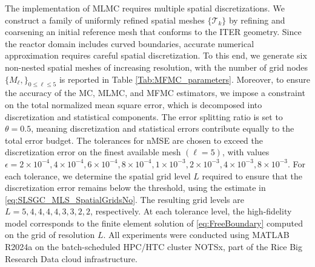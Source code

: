 The implementation of MLMC requires multiple spatial discretizations. We construct a family of uniformly refined spatial meshes $\{\mathcal{T}_k\}$ by refining and coarsening an initial reference mesh that conforms to the ITER geometry. Since the reactor domain includes curved boundaries, accurate numerical approximation requires careful spatial discretization. To this end, we generate six non-nested spatial meshes of increasing resolution, with the number of grid nodes $\{M_\ell,\}_{0\le \ell \le 5}$ is reported in Table \ref{Tab:MFMC_parameters}. Moreover, to ensure the accuracy of the MC, MLMC, and MFMC estimators, we impose a constraint on the total normalized mean square error, which is decomposed into discretization and statistical components. The error splitting ratio is set to $\theta=0.5$, meaning discretization and statistical errors contribute equally to the total error budget. The tolerances for nMSE are chosen to exceed the discretization error on the finest available mesh $(\ell=5)$, with values $\epsilon=2\times 10^{-4}, 4\times 10^{-4}, 6\times 10^{-4}, 8\times 10^{-4}, 1\times 10^{-3}, 2\times 10^{-3}, 4\times 10^{-3}, 8\times 10^{-3}$. For each tolerance, we determine the spatial grid level $L$ required to ensure that the discretization error remains below the threshold, using the estimate in \eqref{eq:SLSGC_MLS_SpatialGridsNo}.  The resulting grid levels are $L = 5, 4, 4, 4, 4, 3, 3, 2, 2$, respectively. At each tolerance level, the high-fidelity model corresponds to the finite element solution of \eqref{eq:FreeBoundary} computed on the grid of resolution $L$. All experiments were conducted using MATLAB R2024a on the batch-scheduled HPC/HTC cluster NOTSx, part of the Rice Big Research Data cloud infrastructure. 



